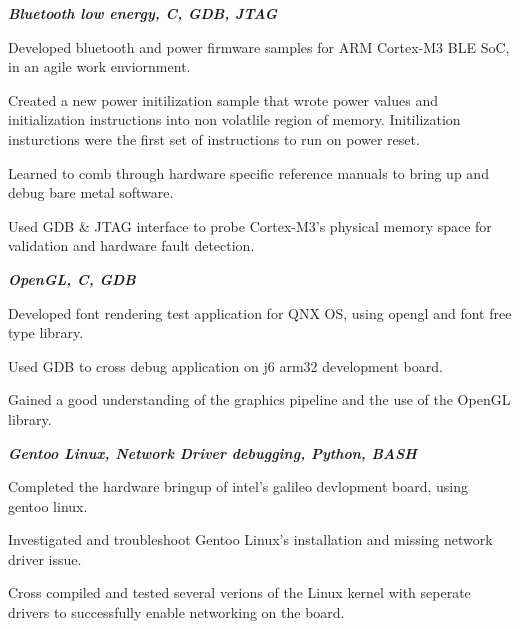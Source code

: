 \documentclass[letterpaper, 10pt]{deedy-resume} %
\begin{document}
\begin{minipage}[t]{0.65\textwidth}
\textit{\bf{Bluetooth low energy, C, GDB, JTAG}}
\vspace{\topsep} %
\begin{tightitemize}
\item Developed bluetooth and power firmware samples for ARM Cortex-M3 BLE SoC, in an agile work enviornment.
\item Created a new power initilization sample that wrote power values and initialization instructions into non volatlile region of memory. Initilization insturctions were the first set of instructions to run on power reset.
\item Learned to comb through hardware specific reference manuals to bring up and debug bare metal software. 
\item Used GDB \& JTAG interface to probe Cortex-M3's physical memory space for validation and hardware fault detection.
\end{tightitemize}

\sectionspace
{}
\textit{\bf{OpenGL, C, GDB}}
\vspace{\topsep} %
\begin{tightitemize}
\item Developed font rendering test application for QNX OS, using opengl and font free type library. 
\item Used GDB to cross debug application on j6 arm32 development board.
\item Gained a good understanding of the graphics pipeline and the use of the OpenGL library. 
\end{tightitemize}
\sectionspace

\textit{\bf{Gentoo Linux, Network Driver debugging, Python, BASH}}
\vspace{\topsep} %
\begin{tightitemize}
\item Completed the hardware bringup of intel's galileo devlopment board, using gentoo linux. 
\item Investigated and troubleshoot Gentoo Linux's installation and missing network driver issue. 
\item Cross compiled and tested several verions of the Linux kernel with seperate drivers to successfully enable networking on the board. 
\end{tightitemize}
\sectionspace


\end{minipage}
\end{document}
